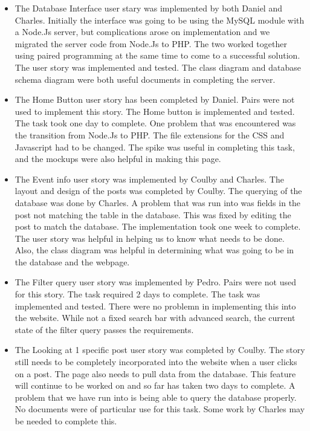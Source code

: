 \documentclass[12pt]{article}
\begin{document}
\begin{itemize}
\item
	The Database Interface user stary was implemented by both Daniel and Charles.
	Initially the interface was going to be using the MySQL module with a
	Node.Js server, but complications arose on implementation and
	we migrated the server code from Node.Js to PHP. The two worked together
	using paired programming at the same time to come to a successful
	solution. The user story was implemented and tested. The class diagram
	and database schema diagram were both useful documents in completing the server.
\item
	The Home Button user story has been completed by Daniel. Pairs were not used to
	implement this story. The Home button is implemented and tested. The
	task took one day to complete. One problem that was encountered was the
	transition from Node.Js to PHP. The file extensions for the CSS and
	Javascript had to be changed. The spike was useful in completing this
	task, and the mockups were also helpful in making this page.
\item
	The Event info user story was implemented by Coulby and Charles. The layout
	and design of the posts was completed by Coulby. The querying of the database was
	done by Charles. A problem that was run into was fields in the post not matching
	the table in the database. This was fixed by editing the post to match the
	database. The implementation took one week to complete. The user story was
	helpful in helping us to know what needs to be done. Also, the class diagram was
	helpful in determining what was going to be in the database and the webpage.
\item
	The Filter query user story was implemented by Pedro. Pairs were not used for
	this story. The task required 2 days to complete. The task was implemented and
	tested. There were no problemn in implementing this into the website. While not
	a fixed search bar with advanced search, the current state of the filter query
	passes the requirements.
\item
	The Looking at 1 specific post user story was completed by Coulby. The story
	still needs to be completely incorporated into the website when a user clicks
	on a post. The page also needs to pull data from the database. This
	feature will continue to be worked on and so far has taken two days to
	complete. A problem that we have run into is being able to query the
	database properly. No documents were of particular use for this task. Some
	work by Charles may be needed to complete this.

\end{itemize}
\end{document}
